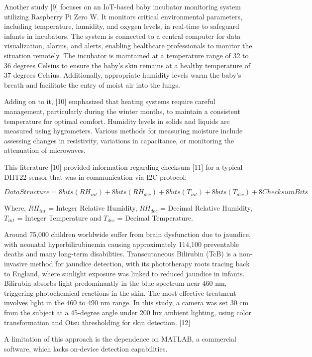 \documentclass{article}
\begin{document}
Another study {[}9{]} focuses on an IoT-based baby incubator monitoring
system utilizing Raspberry Pi Zero W. It monitors critical environmental
parameters, including temperature, humidity, and oxygen levels, in
real-time to safeguard infants in incubators. The system is connected to
a central computer for data visualization, alarms, and alerts, enabling
healthcare professionals to monitor the situation remotely. The
incubator is maintained at a temperature range of 32 to 36 degrees
Celsius to ensure the baby's skin remains at a healthy temperature of 37
degrees Celsius. Additionally, appropriate humidity levels warm the
baby's breath and facilitate the entry of moist air into the lungs.

Adding on to it, {[}10{]} emphasized that heating systems require
careful management, particularly during the winter months, to maintain a
consistent temperature for optimal comfort. Humidity levels in solids
and liquids are measured using hygrometers. Various methods for
measuring moisture include assessing changes in resistivity, variations
in capacitance, or monitoring the attenuation of microwaves.

This literature {[}10{]} provided information regarding checksum
{[}11{]} for a typical DHT22 sensor that was in communication via I2C
protocol:

\[ 
Data Structure = 8 bits (RH_{int}) + 8 bits (RH_{dec}) + 8 bits (T_{int}) + 8 bits (T_{dec}) + 8 Checksum Bits 
\]

Where, \(RH_{int}\) = Integer Relative Humidity, \(RH_{dec}\) = Decimal
Relative Humidity, \(T_{int}\) = Integer Temperature and \(T_{dec}\) =
Decimal Temperature.

Around 75,000 children worldwide suffer from brain dysfunction due to
jaundice, with neonatal hyperbilirubinemia causing approximately 114,100
preventable deaths and many long-term disabilities. Transcutaneous
Bilirubin (TcB) is a non-invasive method for jaundice detection, with
its phototherapy roots tracing back to England, where sunlight exposure
was linked to reduced jaundice in infants. Bilirubin absorbs light
predominantly in the blue spectrum near 460 nm, triggering photochemical
reactions in the skin. The most effective treatment involves light in
the 460 to 490 nm range. In this study, a camera was set 30 cm from the
subject at a 45-degree angle under 200 lux ambient lighting, using color
transformation and Otsu thresholding for skin detection. {[}12{]}

A limitation of this approach is the dependence on MATLAB, a commercial
software, which lacks on-device detection capabilities.
\end{document}
